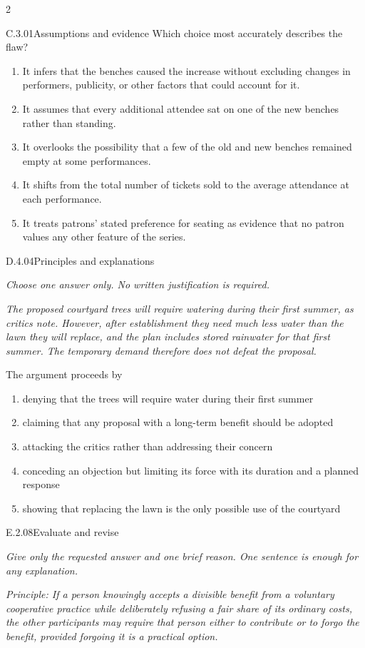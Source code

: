 \documentclass[9pt]{extarticle}
\newcommand{\choice}[1]{\item #1}
\begin{document}
\begin{multicols}{2}
\begin{DenseCoreProblem}{C.3.01}{Assumptions and evidence}
Which choice most accurately describes the flaw?
\begin{enumerate}[label=(\alph*)]
  \choice{It infers that the benches caused the increase without excluding changes in performers, publicity, or other factors that could account for it.}
  \choice{It assumes that every additional attendee sat on one of the new benches rather than standing.}
  \choice{It overlooks the possibility that a few of the old and new benches remained empty at some performances.}
  \choice{It shifts from the total number of tickets sold to the average attendance at each performance.}
  \choice{It treats patrons' stated preference for seating as evidence that no patron values any other feature of the series.}
\end{enumerate}
\end{DenseCoreProblem}
\begin{DenseCoreProblem}{D.4.04}{Principles and explanations}
{\scriptsize\textit{Choose one answer only. No written justification is required.}\par}
\emph{The proposed courtyard trees will require watering during their first summer, as critics note. However, after establishment they need much less water than the lawn they will replace, and the plan includes stored rainwater for that first summer. The temporary demand therefore does not defeat the proposal.}

The argument proceeds by
\begin{enumerate}[label=(\alph*)]
  \choice{denying that the trees will require water during their first summer}
  \choice{claiming that any proposal with a long-term benefit should be adopted}
  \choice{attacking the critics rather than addressing their concern}
  \choice{conceding an objection but limiting its force with its duration and a planned response}
  \choice{showing that replacing the lawn is the only possible use of the courtyard}
\end{enumerate}
\end{DenseCoreProblem}
\begin{DenseCoreProblem}{E.2.08}{Evaluate and revise}
{\scriptsize\textit{Give only the requested answer and one brief reason. One sentence is enough for any explanation.}\par}
\emph{Principle: If a person knowingly accepts a divisible benefit from a voluntary cooperative practice while deliberately refusing a fair share of its ordinary costs, the other participants may require that person either to contribute or to forgo the benefit, provided forgoing it is a practical option.}


\end{DenseCoreProblem}
\end{multicols}
\end{document}
